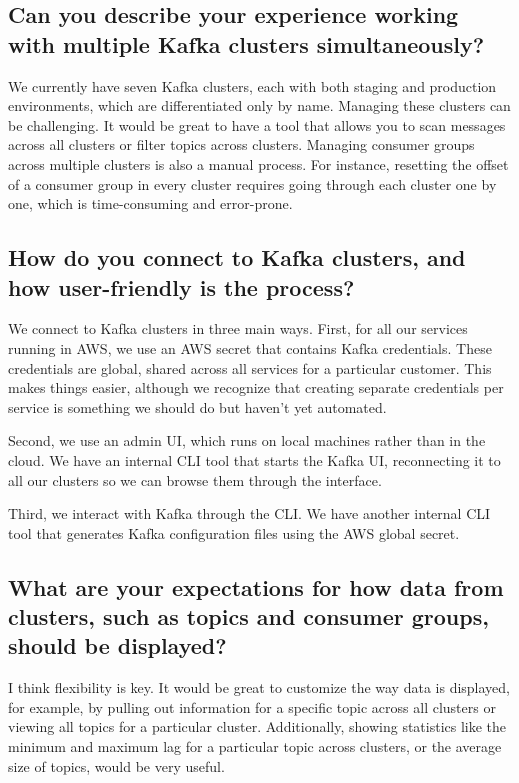 \documentclass[10pt , a4paper]{report}
\begin{document}
\subsection*{Can you describe your experience working with multiple Kafka clusters simultaneously?}

We currently have seven Kafka clusters, each with both staging and production environments, which are differentiated only by name. Managing these clusters can be challenging. It would be great to have a tool that allows you to scan messages across all clusters or filter topics across clusters. Managing consumer groups across multiple clusters is also a manual process. For instance, resetting the offset of a consumer group in every cluster requires going through each cluster one by one, which is time-consuming and error-prone.

\subsection*{How do you connect to Kafka clusters, and how user-friendly is the process?}

We connect to Kafka clusters in three main ways. First, for all our services running in AWS, we use an AWS secret that contains Kafka credentials. These credentials are global, shared across all services for a particular customer. This makes things easier, although we recognize that creating separate credentials per service is something we should do but haven’t yet automated.

Second, we use an admin UI, which runs on local machines rather than in the cloud. We have an internal CLI tool that starts the Kafka UI, reconnecting it to all our clusters so we can browse them through the interface.

Third, we interact with Kafka through the CLI. We have another internal CLI tool that generates Kafka configuration files using the AWS global secret.

\subsection*{What are your expectations for how data from clusters, such as topics and consumer groups, should be displayed?}

I think flexibility is key. It would be great to customize the way data is displayed, for example, by pulling out information for a specific topic across all clusters or viewing all topics for a particular cluster. Additionally, showing statistics like the minimum and maximum lag for a particular topic across clusters, or the average size of topics, would be very useful.
\end{document}
